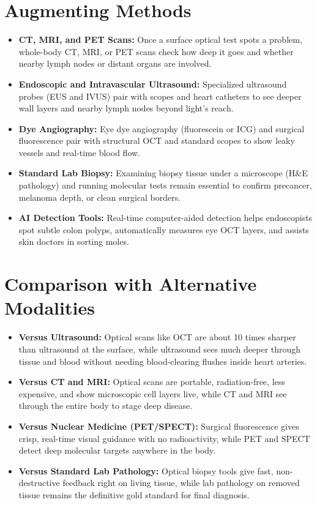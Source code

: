 \section{Augmenting Methods}
\begin{itemize}
  \item \textbf{CT, MRI, and PET Scans:} Once a surface optical test spots a problem, whole-body CT, MRI, or PET scans check how deep it goes and whether nearby lymph nodes or distant organs are involved.
  \item \textbf{Endoscopic and Intravascular Ultrasound:} Specialized ultrasound probes (EUS and IVUS) pair with scopes and heart catheters to see deeper wall layers and nearby lymph nodes beyond light's reach.
  \item \textbf{Dye Angiography:} Eye dye angiography (fluorescein or ICG) and surgical fluorescence pair with structural OCT and standard scopes to show leaky vessels and real-time blood flow.
  \item \textbf{Standard Lab Biopsy:} Examining biopsy tissue under a microscope (H\&E pathology) and running molecular tests remain essential to confirm precancer, melanoma depth, or clean surgical borders.
  \item \textbf{AI Detection Tools:} Real-time computer-aided detection helps endoscopists spot subtle colon polyps, automatically measures eye OCT layers, and assists skin doctors in sorting moles.
\end{itemize}

\section{Comparison with Alternative Modalities}
\begin{itemize}
  \item \textbf{Versus Ultrasound:} Optical scans like OCT are about 10 times sharper than ultrasound at the surface, while ultrasound sees much deeper through tissue and blood without needing blood-clearing flushes inside heart arteries.
  \item \textbf{Versus CT and MRI:} Optical scans are portable, radiation-free, less expensive, and show microscopic cell layers live, while CT and MRI see through the entire body to stage deep disease.
  \item \textbf{Versus Nuclear Medicine (PET/SPECT):} Surgical fluorescence gives crisp, real-time visual guidance with no radioactivity, while PET and SPECT detect deep molecular targets anywhere in the body.
  \item \textbf{Versus Standard Lab Pathology:} Optical biopsy tools give fast, non-destructive feedback right on living tissue, while lab pathology on removed tissue remains the definitive gold standard for final diagnosis.
\end{itemize}

